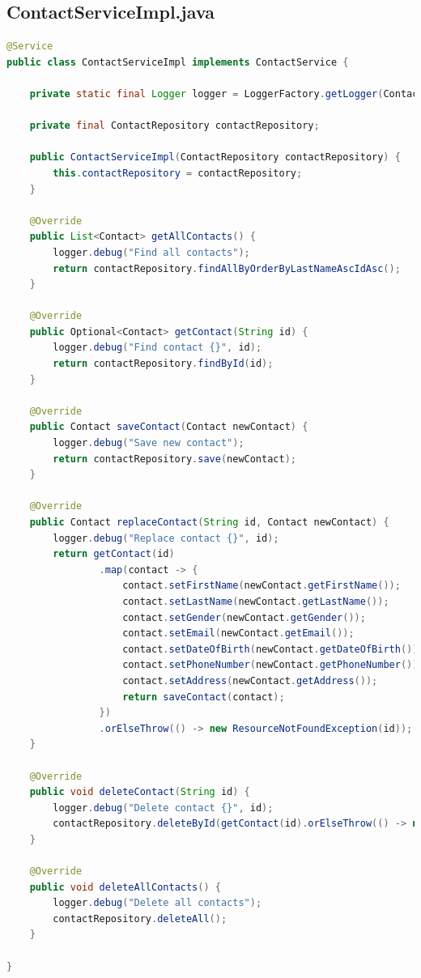 \subsection*{ContactServiceImpl.java}

\begin{lstlisting}[language=java]
@Service
public class ContactServiceImpl implements ContactService {

    private static final Logger logger = LoggerFactory.getLogger(ContactApplication.class);

    private final ContactRepository contactRepository;

    public ContactServiceImpl(ContactRepository contactRepository) {
        this.contactRepository = contactRepository;
    }

    @Override
    public List<Contact> getAllContacts() {
        logger.debug("Find all contacts");
        return contactRepository.findAllByOrderByLastNameAscIdAsc();
    }

    @Override
    public Optional<Contact> getContact(String id) {
        logger.debug("Find contact {}", id);
        return contactRepository.findById(id);
    }

    @Override
    public Contact saveContact(Contact newContact) {
        logger.debug("Save new contact");
        return contactRepository.save(newContact);
    }

    @Override
    public Contact replaceContact(String id, Contact newContact) {
        logger.debug("Replace contact {}", id);
        return getContact(id)
                .map(contact -> {
                    contact.setFirstName(newContact.getFirstName());
                    contact.setLastName(newContact.getLastName());
                    contact.setGender(newContact.getGender());
                    contact.setEmail(newContact.getEmail());
                    contact.setDateOfBirth(newContact.getDateOfBirth());
                    contact.setPhoneNumber(newContact.getPhoneNumber());
                    contact.setAddress(newContact.getAddress());
                    return saveContact(contact);
                })
                .orElseThrow(() -> new ResourceNotFoundException(id));
    }

    @Override
    public void deleteContact(String id) {
        logger.debug("Delete contact {}", id);
        contactRepository.deleteById(getContact(id).orElseThrow(() -> new ResourceNotFoundException(id)).getId());
    }

    @Override
    public void deleteAllContacts() {
        logger.debug("Delete all contacts");
        contactRepository.deleteAll();
    }

}
\end{lstlisting}

